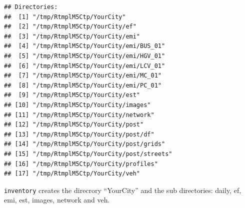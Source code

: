 \documentclass[12pt,graybox,envcountchap,sectrefs]{krantz}
\theoremstyle{definition}
\theoremstyle{definition}
\theoremstyle{definition}
\theoremstyle{remark}
\begin{document}
\begin{verbatim}
## Directories:
##  [1] "/tmp/RtmplM5Ctp/YourCity"             
##  [2] "/tmp/RtmplM5Ctp/YourCity/ef"          
##  [3] "/tmp/RtmplM5Ctp/YourCity/emi"         
##  [4] "/tmp/RtmplM5Ctp/YourCity/emi/BUS_01"  
##  [5] "/tmp/RtmplM5Ctp/YourCity/emi/HGV_01"  
##  [6] "/tmp/RtmplM5Ctp/YourCity/emi/LCV_01"  
##  [7] "/tmp/RtmplM5Ctp/YourCity/emi/MC_01"   
##  [8] "/tmp/RtmplM5Ctp/YourCity/emi/PC_01"   
##  [9] "/tmp/RtmplM5Ctp/YourCity/est"         
## [10] "/tmp/RtmplM5Ctp/YourCity/images"      
## [11] "/tmp/RtmplM5Ctp/YourCity/network"     
## [12] "/tmp/RtmplM5Ctp/YourCity/post"        
## [13] "/tmp/RtmplM5Ctp/YourCity/post/df"     
## [14] "/tmp/RtmplM5Ctp/YourCity/post/grids"  
## [15] "/tmp/RtmplM5Ctp/YourCity/post/streets"
## [16] "/tmp/RtmplM5Ctp/YourCity/profiles"    
## [17] "/tmp/RtmplM5Ctp/YourCity/veh"
\end{verbatim}

\texttt{inventory} creates the direcrory ``YourCity'' and the sub
directories: daily, ef, emi, est, images, network and veh.
\end{document}
